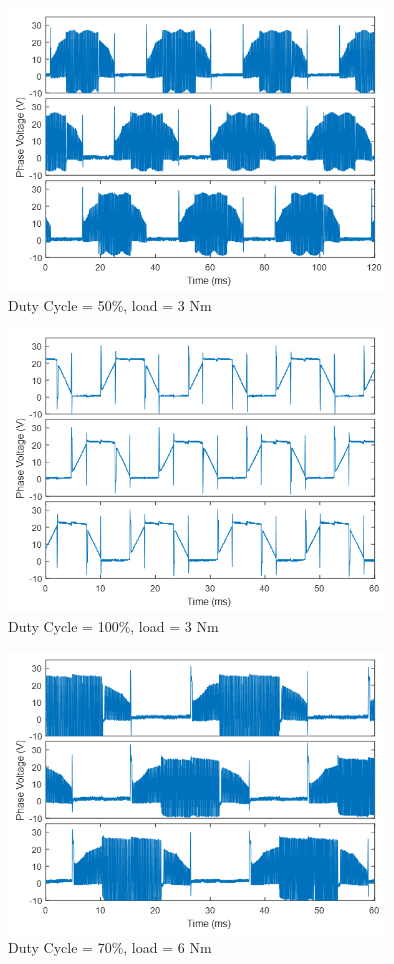 \begin{figure}[h!p]
\centering
\includegraphics[width=10cm]{Images/waveforms/trap_7.png} 
\caption[trap7]{Duty Cycle = 50\%, load = 3 Nm}
\label{fig:trap7}
\end{figure}

\begin{figure}[h!p]
\centering
\includegraphics[width=10cm]{Images/waveforms/trap_8.png} 
\caption[trap8]{Duty Cycle = 100\%, load = 3 Nm}
\label{fig:trap8}
\end{figure}

\begin{figure}[h!p]
\centering
\includegraphics[width=10cm]{Images/waveforms/trap_9.png} 
\caption[trap9]{Duty Cycle = 70\%, load = 6 Nm}
\label{fig:trap9}
\end{figure}

